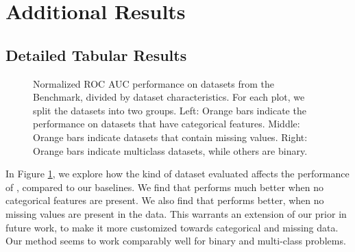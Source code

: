 \documentclass{article}
\begin{document}
\section{Additional Results}\label{app:ssec:addresults}
\subsection{Detailed Tabular Results}
\label{app:sec:detailed_results}
\begin{figure}[h]
 \centering
 \hspace*{-0.9cm}
 
      \caption{Normalized ROC AUC performance on datasets from the \openmlcc{} Benchmark, divided by dataset characteristics. For each plot, we split the datasets into two groups. Left: Orange bars indicate the performance on datasets that have categorical features. Middle: Orange bars indicate datasets that contain missing values. Right: Orange bars indicate multiclass datasets, while others are binary.}
 \label{fig:results_dataset_characteristics}
\end{figure}
     
In Figure \ref{fig:results_dataset_characteristics}, we explore how the kind of dataset evaluated affects the performance of \methodname{}, compared to our baselines. We find that \methodname{} performs much better when no categorical features are present. 
We also find that \methodname{} performs better, when no missing values are present in the data.
This warrants an extension of our prior in future work, to make it more customized towards categorical and missing data.
Our method seems to work comparably well for binary and multi-class problems.
\end{document}
